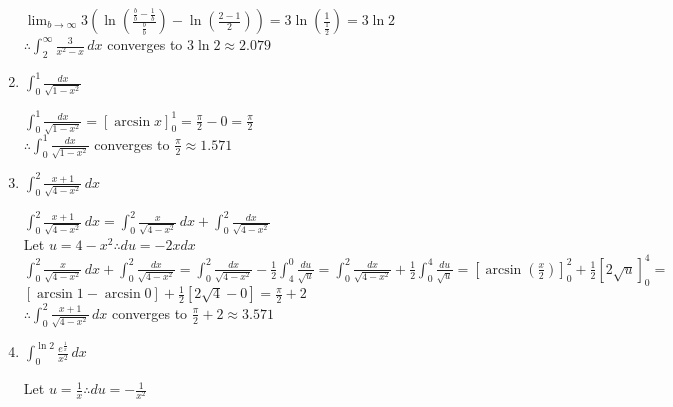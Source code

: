 \documentclass[10pt, letterpaper]{report}
\begin{document}
\begin{enumerate}
    $\lim_{b\to\infty}3\left(\ln{\left(\frac{\frac{b}{b}-\frac{1}{b}}{\frac{b}{b}}\right)}-\ln{\left(\frac{2-1}{2}\right)}\right)=
    3\ln{\left(\frac{1}{\frac{1}{2}}\right)}=3\ln{2}$ \\
    
    $\therefore \int_{2}^{\infty}{\frac{3}{x^{2}-x}}\,dx$ converges to $3\ln{2}\approx 2.079$ \\
    
  \item{$\int_{0}^{1}{\frac{dx}{\sqrt{1-x^{2}}}}$ \\}
  
    $\int_{0}^{1}{\frac{dx}{\sqrt{1-x^{2}}}}=
    [\arcsin{x}]_{0}^{1}=
    \frac{\pi}{2}-0=\frac{\pi}{2}$ \\
    
    $\therefore \int_{0}^{1}{\frac{dx}{\sqrt{1-x^{2}}}}$ converges to $\frac{\pi}{2}\approx 1.571$ \\
    \pagebreak 
    
  \item{$\int_{0}^{2}{\frac{x+1}{\sqrt{4-x^{2}}}}\,dx$ \\}
  
    $\int_{0}^{2}{\frac{x+1}{\sqrt{4-x^{2}}}}\,dx=
    \int_{0}^{2}{\frac{x}{\sqrt{4-x^{2}}}}\,dx+\int_{0}^{2}{\frac{dx}{\sqrt{4-x^{2}}}}$ \\
    
    Let $u=4-x^{2}\therefore du=-2xdx$ \\
    
    $\int_{0}^{2}{\frac{x}{\sqrt{4-x^{2}}}}\,dx+\int_{0}^{2}{\frac{dx}{\sqrt{4-x^{2}}}}=
    \int_{0}^{2}{\frac{dx}{\sqrt{4-x^{2}}}}-\frac{1}{2}\int_{4}^{0}{\frac{du}{\sqrt{u}}}=
    \int_{0}^{2}{\frac{dx}{\sqrt{4-x^{2}}}}+\frac{1}{2}\int_{0}^{4}{\frac{du}{\sqrt{u}}}=
    [\arcsin{\left(\frac{x}{2}\right)}]_{0}^{2}+\frac{1}{2}[2\sqrt{u}]_{0}^{4}=$ \\
    
    $[\arcsin{1}-\arcsin{0}]+\frac{1}{2}[2\sqrt{4}-0]=
    \frac{\pi}{2}+2$ \\
    
    $\therefore \int_{0}^{2}{\frac{x+1}{\sqrt{4-x^{2}}}}\,dx$ converges to $\frac{\pi}{2}+2\approx 3.571$ \\
    
  \item{$\int_{0}^{\ln{2}}{\frac{e^{\frac{1}{x}}}{x^{2}}}\,dx$ \\}
  
    Let $u=\frac{1}{x} \therefore du=-\frac{1}{x^{2}}$ \\
    

\end{enumerate}
\end{document}
